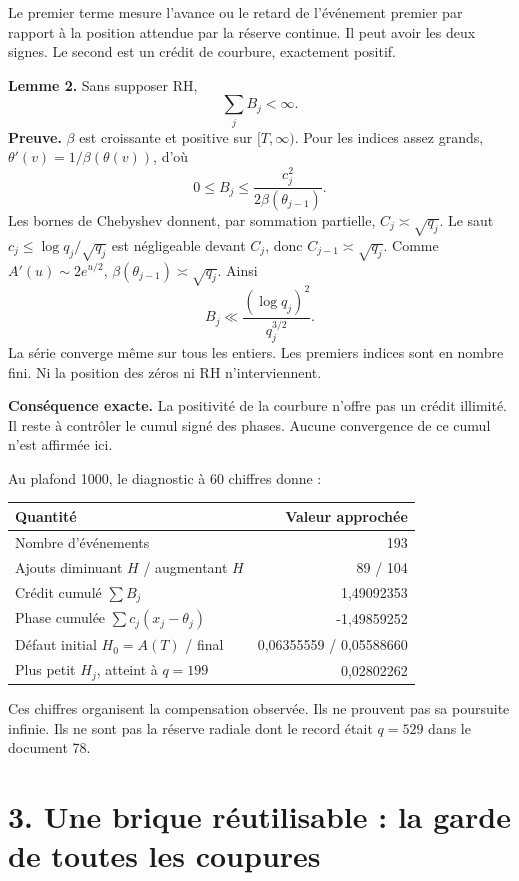 \documentclass[
  11pt,
  a4paper,
]{article}
\begin{document}
Le premier terme mesure l'avance ou le retard de l'événement premier par
rapport à la position attendue par la réserve continue. Il peut avoir
les deux signes. Le second est un crédit de courbure, exactement
positif.

\textbf{Lemme 2.} Sans supposer RH, \[
\sum_j B_j<\infty.
\] \textbf{Preuve.} \(\beta\) est croissante et positive sur
\([T,\infty)\). Pour les indices assez grands,
\(\theta'(v)=1/\beta(\theta(v))\), d'où \[
0\le B_j\le\frac{c_j^2}{2\beta(\theta_{j-1})}.
\] Les bornes de Chebyshev donnent, par sommation partielle,
\(C_j\asymp\sqrt{q_j}\). Le saut \(c_j\le\log q_j/\sqrt{q_j}\) est
négligeable devant \(C_j\), donc \(C_{j-1}\asymp\sqrt{q_j}\). Comme
\(A'(u)\sim2e^{u/2}\), \(\beta(\theta_{j-1})\asymp\sqrt{q_j}\). Ainsi \[
B_j\ll\frac{(\log q_j)^2}{q_j^{3/2}}.
\] La série converge même sur tous les entiers. Les premiers indices
sont en nombre fini. Ni la position des zéros ni RH n'interviennent.

\textbf{Conséquence exacte.} La positivité de la courbure n'offre pas un
crédit illimité. Il reste à contrôler le cumul signé des phases. Aucune
convergence de ce cumul n'est affirmée ici.

Au plafond 1000, le diagnostic à 60 chiffres donne :

\begin{longtable}[]{@{}lr@{}}
\toprule\noalign{}
Quantité & Valeur approchée \\
\midrule\noalign{}
\endhead
\bottomrule\noalign{}
\endlastfoot
Nombre d'événements & 193 \\
Ajouts diminuant \(H\) / augmentant \(H\) & 89 / 104 \\
Crédit cumulé \(\sum B_j\) & 1,49092353 \\
Phase cumulée \(\sum c_j(x_j-\theta_j)\) & -1,49859252 \\
Défaut initial \(H_0=A(T)\) / final & 0,06355559 / 0,05588660 \\
Plus petit \(H_j\), atteint à \(q=199\) & 0,02802262 \\
\end{longtable}

Ces chiffres organisent la compensation observée. Ils ne prouvent pas sa
poursuite infinie. Ils ne sont pas la réserve radiale dont le record
était \(q=529\) dans le document 78.

\newpage

\hypertarget{une-brique-ruxe9utilisable-la-garde-de-toutes-les-coupures}{%
\section{3. Une brique réutilisable : la garde de toutes les
coupures}\label{une-brique-ruxe9utilisable-la-garde-de-toutes-les-coupures}}
\end{document}
